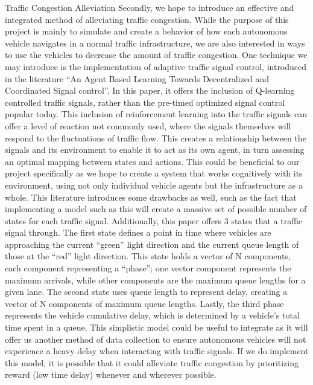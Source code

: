 \documentclass[letterpaper,10pt,draftclsnofoot,onecolumn]{IEEEtran} %
\begin{document}
\begin{section}{Traffic Congestion Alleviation}
Secondly, we hope to introduce an effective and integrated method of alleviating traffic congestion. While the purpose
of this project is mainly to simulate and create a behavior of how each autonomous vehicle navigates in a normal
traffic infrastructure, we are also interested in ways to use the vehicles to decrease the amount of traffic congestion.
One technique we may introduce is the implementation of adaptive traffic signal control, introduced in the literature
“An Agent Based Learning Towards Decentralized and Coordinated Signal control”. In this paper, it offers the
inclusion of Q-learning controlled traffic signals, rather than the pre-timed optimized signal control popular today.
This inclusion of reinforcement learning into the traffic signals can offer a level of reaction not commonly used, where
the signals themselves will respond to the fluctuations of traffic flow. This creates a relationship between the signals
and its environment to enable it to act as its own agent, in turn assessing an optimal mapping between states and
actions. This could be beneficial to our project specifically as we hope to create a system that works cognitively with
its environment, using not only individual vehicle agents but the infrastructure as a whole. This literature introduces
some drawbacks as well, such as the fact that implementing a model such as this will create a massive set of possible
number of states for each traffic signal.
Additionally, this paper offers 3 states that a traffic signal through. The first state defines a point in time
where vehicles are approaching the current “green” light direction and the current queue length of those at the “red”
light direction. This state holds a vector of N components, each component representing a “phase”; one vector
component represents the maximum arrivals, while other components are the maximum queue lengths for a given lane. The second state uses queue length to represent delay, creating a vector of N components of maximum queue
lengths. Lastly, the third phase represents the vehicle cumulative delay, which is determined by a vehicle’s total time
spent in a queue. This simplistic model could be useful to integrate as it will offer us another method of data collection
to ensure autonomous vehicles will not experience a heavy delay when interacting with traffic signals. If we do
implement this model, it is possible that it could alleviate traffic congestion by prioritizing reward (low time delay)
whenever and wherever possible.

\end{section}
\end{document}
